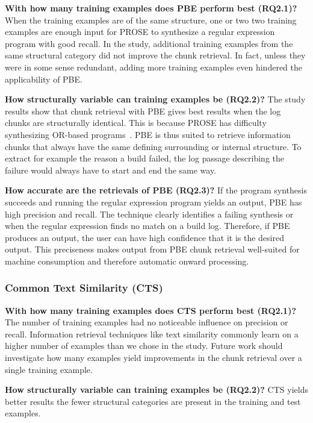 \documentclass[10pt,journal,compsoc]{IEEEtran}
\begin{document}
\noindent
\textbf{With how many training examples does PBE perform best (RQ2.1)?}
When the training examples are of the same structure, one or two
two training examples are enough input for PROSE to synthesize a regular
expression program with good recall.
In the study, additional training
examples from the same structural category
did not improve the chunk retrieval.
In fact, unless they
were in some sense redundant, adding more training examples even
hindered the applicability of PBE.

\noindent
\textbf{How structurally variable can training examples be (RQ2.2)?}
The study results show that chunk retrieval with PBE gives best
results when the log chunks are structurally identical.
This is
because PROSE has difficulty synthesizing OR-based
programs~\cite{mayer2015user}.
PBE is thus suited to retrieve information
chunks that always have the same defining surrounding or internal
structure.
To extract for example the reason a build failed, the log
passage describing the failure would always have to start and
end the same way.

\noindent
\textbf{How accurate are the retrievals of PBE (RQ2.3)?}
If the program synthesis succeeds and running the regular expression
program yields an output, PBE has high precision and recall.
The technique
clearly identifies a failing synthesis or when the regular expression
finds no match on a build log.
Therefore, if PBE produces
an output, the user can have high confidence that it is the desired
output.
This preciseness makes output from PBE chunk retrieval
well-suited for machine consumption and therefore automatic onward
processing.

\subsubsection{Common Text Similarity (CTS)}

\noindent
\textbf{With how many training examples does CTS perform best (RQ2.1)?}
The number of training examples had no noticeable influence on
precision or recall.
Information retrieval techniques
like text similarity commonly learn on a higher number of examples
than we chose in the study.
Future work should investigate how many
examples yield improvements in the chunk retrieval over a single
training example.

\noindent
\textbf{How structurally variable can training examples be (RQ2.2)?}
CTS yields better results the
fewer structural categories are present in the training and test
examples.
\end{document}
